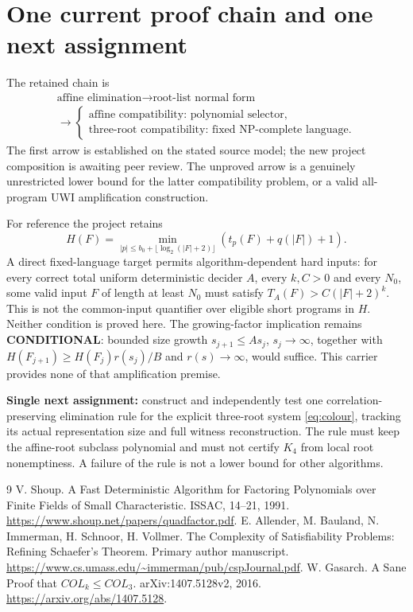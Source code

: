 \documentclass[11pt]{article}
\newcommand{\COND}{\textbf{CONDITIONAL}}
\begin{document}
\section{One current proof chain and one next assignment}
The retained chain is
\[
 \begin{gathered}
 \text{affine elimination}\longrightarrow\text{root-list normal form}\\
 \longrightarrow\begin{cases}
 \text{affine compatibility: polynomial selector},\\
 \text{three-root compatibility: fixed NP-complete language}.
 \end{cases}\end{gathered}
\]
The first arrow is established on the stated source model; the new project
composition is awaiting peer review. The unproved arrow is a genuinely
unrestricted lower bound for the latter compatibility problem, or a valid
all-program UWI amplification construction.

For reference the project retains
\[
 H(F)=\min_{|p|\le b_0+\lfloor\log_2(|F|+2)\rfloor}
           (t_p(F)+q(|F|)+1).
\]
A direct fixed-language target permits algorithm-dependent hard inputs:
for every correct total uniform deterministic decider $A$, every $k,C>0$
and every $N_0$, some valid input $F$ of length at least $N_0$ must satisfy
$T_A(F)>C(|F|+2)^k$. This is not the common-input quantifier over eligible
short programs in $H$. Neither condition is proved here.
The growing-factor implication remains \COND{}: bounded size growth
$s_{j+1}\le As_j$, $s_j\to\infty$, together with
$H(F_{j+1})\ge H(F_j)r(s_j)/B$ and $r(s)\to\infty$, would suffice.
This carrier provides none of that amplification premise.

\textbf{Single next assignment:} construct and independently test one
correlation-preserving elimination rule for the explicit three-root system
\eqref{eq:colour}, tracking its actual representation size and full witness
reconstruction. The rule must keep the affine-root subclass polynomial and
must not certify $K_4$ from local root nonemptiness. A failure of the rule is
not a lower bound for other algorithms.

\begin{thebibliography}{9}
 V. Shoup. A Fast Deterministic Algorithm for Factoring
Polynomials over Finite Fields of Small Characteristic. ISSAC, 14--21, 1991.
\url{https://www.shoup.net/papers/quadfactor.pdf}.
 E. Allender, M. Bauland, N. Immerman, H. Schnoor,
H. Vollmer. The Complexity of Satisfiability Problems: Refining Schaefer's
Theorem. Primary author manuscript.
\url{https://www.cs.umass.edu/~immerman/pub/cspJournal.pdf}.
 W. Gasarch. A Sane Proof that $COL_k\le COL_3$.
arXiv:1407.5128v2, 2016. \url{https://arxiv.org/abs/1407.5128}.
\end{thebibliography}
\end{document}
